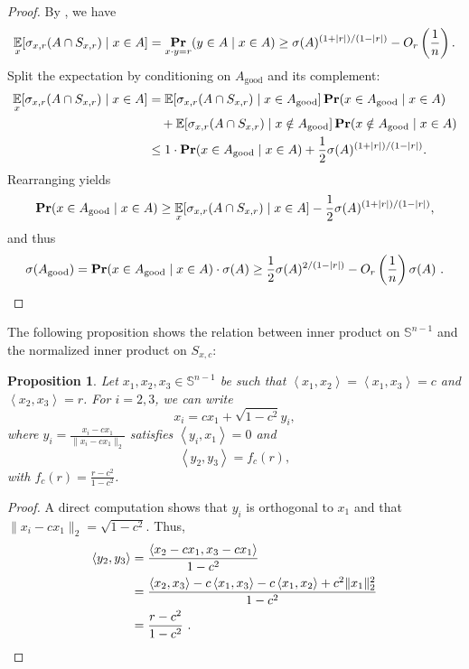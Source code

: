 \documentclass[11pt]{article}
\newtheorem{proposition}[theorem]{Proposition}
\newcommand{\inner}[1]{\left\langle{#1}\right\rangle}
\renewcommand{\Pr}{\mathop{\bf Pr\/}}
\newcommand{\E}{\mathop{\mathbb E\/}}
\newcommand{\sn}{{\mathbb{S}^{n-1} }}
\begin{document}
\begin{proof}
By , we have
\[
\E_{x}[\sigma_{x, r}(A \cap S_{x, r}) \mid x \in A] = \Pr_{x \cdot y = r}(y \in A \mid x \in A) \geq \sigma(A)^{(1 + |r|)/(1 - |r|)} - O_r\left(\frac{1}{n}\right).
\]
Split the expectation by conditioning on \( A_{\mathrm{good}} \) and its complement:
\begin{align*}
\E_{x}[\sigma_{x, r}(A \cap S_{x, r}) \mid x \in A]
&= \E[\sigma_{x, r}(A \cap S_{x, r}) \mid x \in A_{\mathrm{good}}] \Pr(x \in A_{\mathrm{good}} \mid x \in A) \\
&\quad + \E[\sigma_{x, r}(A \cap S_{x, r}) \mid x \notin A_{\mathrm{good}}] \Pr(x \notin A_{\mathrm{good}} \mid x \in A) \\
&\leq 1 \cdot \Pr(x \in A_{\mathrm{good}} \mid x \in A) + \frac{1}{2} \sigma(A)^{(1 + |r|)/(1 - |r|)}.
\end{align*}
Rearranging yields
\[
\Pr(x \in A_{\mathrm{good}} \mid x \in A) \geq \E_{x}[\sigma_{x, r}(A \cap S_{x, r}) \mid x \in A] - \frac{1}{2}\sigma(A)^{(1 + |r|)/(1 - |r|)},
\]
and thus
\[
\sigma(A_{\mathrm{good}}) = \Pr(x \in A_{\mathrm{good}} \mid x \in A) \cdot \sigma(A) \geq \frac{1}{2}\sigma(A)^{2/(1 - |r|)} - O_r\left(\frac{1}{n}\right)\sigma(A) \ . \qedhere
\]
\end{proof}
The following proposition shows the relation between inner product on $\sn$ and the normalized inner product on $S_{x,c}$:
\begin{proposition}
\label{prop: inner product relation}
Let \( x_1, x_2, x_3 \in \sn \) be such that \( \inner{x_1, x_2} = \inner{x_1, x_3} = c \) and \( \inner{x_2, x_3} = r \). For \( i = 2, 3 \), we can write
\[
x_i = c x_1 + \sqrt{1 - c^2} y_i,
\]
where \( y_i = \frac{x_i - c x_1}{\|x_i - c x_1\|_2} \) satisfies \( \inner{y_i, x_1} = 0 \) and
\[
\inner{y_2, y_3} = f_c(r),
\]
with \( f_c(r) = \frac{r - c^2}{1 - c^2} \).
\end{proposition}

\begin{proof}
A direct computation shows that \( y_i \) is orthogonal to \( x_1 \) and that \( \|x_i - c x_1\|_2 = \sqrt{1 - c^2} \). Thus,
\begin{align*}
\inner{y_2, y_3} &= \frac{\inner{x_2 - c x_1, x_3 - c x_1}}{1 - c^2} \\
&= \frac{\inner{x_2, x_3} - c \inner{x_1, x_3} - c \inner{x_1, x_2} + c^2 \|x_1\|_2^2}{1 - c^2} \\
&= \frac{r - c^2}{1 - c^2} \ . \qedhere
\end{align*}
\end{proof}
\end{document}
